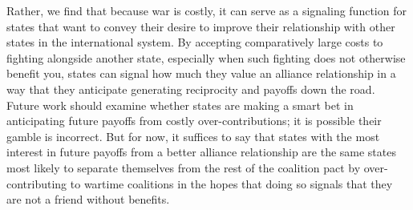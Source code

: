 \documentclass[12pt,letterpaper]{article}
\begin{document}
	Rather, we find that because war is costly, it can serve as a signaling function for states that want to convey their desire to improve their relationship with other states in the international system. By accepting comparatively large costs to fighting alongside another state, especially when such fighting does not otherwise benefit you, states can signal how much they value an alliance relationship in a way that they anticipate generating reciprocity and payoffs down the road. Future work should examine whether states are making a smart bet in anticipating future payoffs from costly over-contributions; it is possible their gamble is incorrect. But for now, it suffices to say that states with the most interest in future payoffs from a better alliance relationship are the same states most likely to separate themselves from the rest of the coalition pact by over-contributing to wartime coalitions in the hopes that doing so signals that they are not a friend without benefits.



\end{document}
